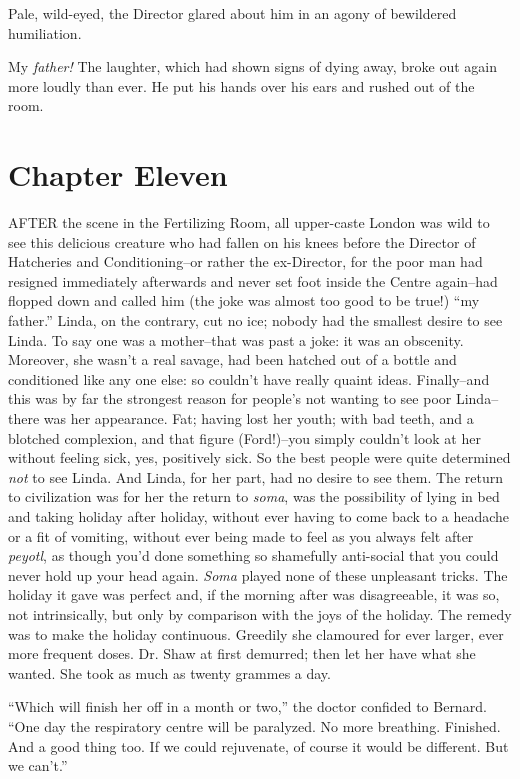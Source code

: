 \documentclass[12pt]{report}
\newcommand{\mychapter}[2]{
\setcounter{chapter}{#1}
    \setcounter{section}{0}
    \chapter*{#2}
    \addcontentsline{toc}{chapter}{#2}
}
\begin{document}
Pale, wild-eyed, the Director glared about him in an agony of bewildered
humiliation.

My \emph{father!} The laughter, which had shown signs of dying away,
broke out again more loudly than ever. He put his hands over his ears
and rushed out of the room.

\mychapter{11}{Chapter Eleven}
AFTER the scene in the Fertilizing Room, all upper-caste London was wild
to see this delicious creature who had fallen on his knees before the
Director of Hatcheries and Conditioning--or rather the ex-Director, for
the poor man had resigned immediately afterwards and never set foot
inside the Centre again--had flopped down and called him (the joke was
almost too good to be true!) ``my father.'' Linda, on the contrary, cut
no ice; nobody had the smallest desire to see Linda. To say one was a
mother--that was past a joke: it was an obscenity. Moreover, she wasn't
a real savage, had been hatched out of a bottle and conditioned like any
one else: so couldn't have really quaint ideas. Finally--and this was by
far the strongest reason for people's not wanting to see poor
Linda--there was her appearance. Fat; having lost her youth; with bad
teeth, and a blotched complexion, and that figure (Ford!)--you simply
couldn't look at her without feeling sick, yes, positively sick. So the
best people were quite determined \emph{not} to see Linda. And Linda,
for her part, had no desire to see them. The return to civilization was
for her the return to \emph{soma}, was the possibility of lying in bed
and taking holiday after holiday, without ever having to come back to a
headache or a fit of vomiting, without ever being made to feel as you
always felt after \emph{peyotl}, as though you'd done something so
shamefully anti-social that you could never hold up your head again.
\emph{Soma} played none of these unpleasant tricks. The holiday it gave
was perfect and, if the morning after was disagreeable, it was so, not
intrinsically, but only by comparison with the joys of the holiday. The
remedy was to make the holiday continuous. Greedily she clamoured for
ever larger, ever more frequent doses. Dr. Shaw at first demurred; then
let her have what she wanted. She took as much as twenty grammes a day.

``Which will finish her off in a month or two,'' the doctor confided to
Bernard. ``One day the respiratory centre will be paralyzed. No more
breathing. Finished. And a good thing too. If we could rejuvenate, of
course it would be different. But we can't.''
\end{document}
